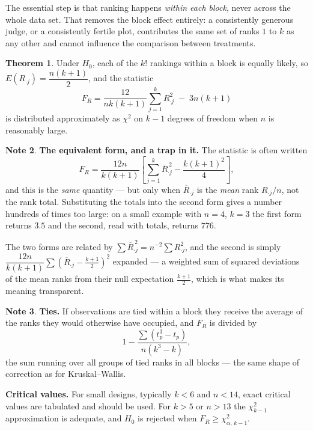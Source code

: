 \documentclass[11pt,a4paper]{article}
\theoremstyle{definition}
\newtheorem{thm}{Theorem}[section]
\newtheorem{note}[thm]{Note}
\begin{document}
The essential step is that ranking happens \emph{within each block}, never across
the whole data set. That removes the block effect entirely: a consistently generous
judge, or a consistently fertile plot, contributes the same set of ranks $1$ to $k$
as any other and cannot influence the comparison between treatments.

\begin{thm}
Under $H_0$, each of the $k!$ rankings within a block is equally likely, so
$E\left(R_{\cdot j}\right) = \dfrac{n(k+1)}{2}$, and the statistic
$$F_R = \dfrac{12}{nk(k+1)}\sum^{k}_{j=1}R_{\cdot j}^{2} \;-\; 3n(k+1)$$
is distributed approximately as $\chi^{2}$ on $k-1$ degrees of freedom when $n$ is
reasonably large.
\end{thm}

\begin{note}
\textbf{The equivalent form, and a trap in it.} The statistic is often written
$$F_R = \dfrac{12n}{k(k+1)}
\left[\sum^{k}_{j=1}\overline{R}_{\cdot j}^{\,2} - \dfrac{k(k+1)^{2}}{4}\right],$$
and this is the \emph{same} quantity --- but only when $\overline{R}_{\cdot j}$ is
the \emph{mean} rank $R_{\cdot j}/n$, not the rank total. Substituting the totals
into the second form gives a number hundreds of times too large: on a small
example with $n = 4$, $k = 3$ the first form returns $3.5$ and the second, read
with totals, returns $776$.

The two forms are related by
$\sum \overline{R}_{\cdot j}^{\,2} = n^{-2}\sum R_{\cdot j}^{2}$, and the second is
simply $\dfrac{12n}{k(k+1)}\sum\left(\overline{R}_{\cdot j} - \frac{k+1}{2}\right)^{2}$
expanded --- a weighted sum of squared deviations of the mean ranks from their null
expectation $\frac{k+1}{2}$, which is what makes its meaning transparent.
\end{note}

\begin{note}
\textbf{Ties.} If observations are tied within a block they receive the average of
the ranks they would otherwise have occupied, and $F_R$ is divided by
$$1 - \dfrac{\sum\left(t_p^{3} - t_p\right)}{n\left(k^{3}-k\right)},$$
the sum running over all groups of tied ranks in all blocks --- the same shape of
correction as for Kruskal--Wallis.
\end{note}

\textbf{Critical values.} For small designs, typically $k < 6$ and $n < 14$, exact
critical values are tabulated and should be used. For $k > 5$ or $n > 13$ the
$\chi^{2}_{k-1}$ approximation is adequate, and $H_0$ is rejected when
$F_R \geq \chi^{2}_{\alpha,\,k-1}$.
\end{document}
